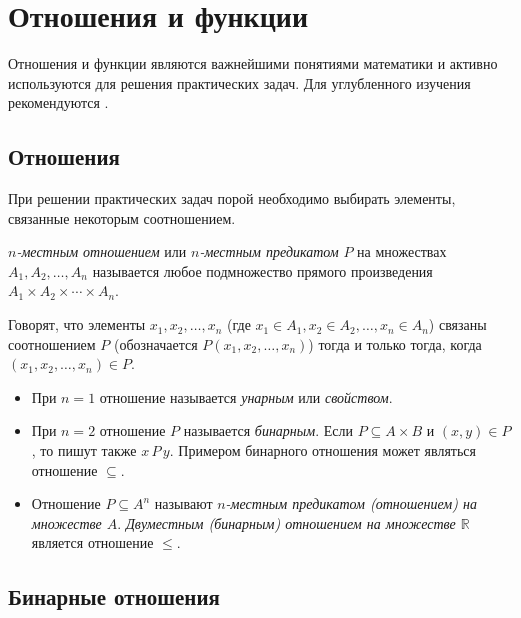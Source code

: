 \chapter{Отношения и функции} 
\label{ch:rel:rel}
Отношения и функции являются важнейшими понятиями математики и активно используются для решения практических задач. Для углубленного изучения рекомендуются \cite{bib:sudoplatov:discrmath, bib:haggard:discrmathprogrammer}.


\section{Отношения}

При решении практических задач порой необходимо выбирать элементы, связанные некоторым соотношением.


\emph{$n$-местным отношением} или \emph{$n$-местным предикатом} $P$ на множествах $A_1, A_2, \ldots, A_n$ называется любое подмножество прямого произведения $A_1\times A_2\times \cdots\times A_n$.

Говорят, что элементы $x_1,x_2,\ldots,x_n$ (где $x_1\in A_1,x_2\in A_2,\ldots,x_n\in A_n$) связаны соотношением $P$ (обозначается $P(x_1,x_2,\ldots,x_n)$) тогда и только тогда, когда $(x_1,x_2,\ldots,x_n)\in P$.

\begin{itemize}
	\item При $n=1$ отношение называется \emph{унарным} или \emph{свойством}. 
	\item При $n=2$ отношение $P$ называется \emph{бинарным}. Если $P\subseteq A\times B$ и $(x,y)\in P$, то пишут также $x\,P\,y$. Примером бинарного отношения может являться отношение $\subseteq$.
	\item Отношение $P\subseteq A^n$ называют \emph{$n$-местным предикатом (отношением) на множестве $A$}. \emph{Двуместным (бинарным) отношением на множестве $\mathbb{R}$} является отношение $\leq$.
\end{itemize}


\section{Бинарные отношения}

